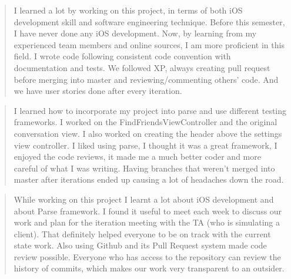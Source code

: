 \begin{quote}
I learned a lot by working on this project, in terms of both iOS development skill and software engineering technique. Before this semester, I have never done any iOS development. Now, by learning from my experienced team members and online sources, I am more proficient in this field. I wrote code following consistent code convention with documentation and tests. We followed XP, always creating pull request before merging into master and reviewing/commenting others’ code. And we have user stories done after every iteration.
\end{quote}

\begin{quote}
I learned how to incorporate my project into parse and use different testing frameworks. I worked on the FindFriendsViewController and the original conversation view. I also worked on creating the header above the settings view controller. I liked using parse, I thought it was a great framework, I enjoyed the code reviews, it made me a much better coder and more careful of what I was writing. Having branches that weren't merged into master after iterations ended up causing a lot of headaches down the road.
\end{quote}

\begin{quote}
While working on this project I learnt a lot about iOS development and about Parse framework. I found it useful to meet each week to discuss our work and plan for the iteration meeting with the TA (who is simulating a client). That definitely helped everyone to be on track with the current state work. Also using Github and its Pull Request system made code review possible. Everyone who has access to the repository can review the history of commits, which makes our work very transparent to an outsider.
\end{quote}

